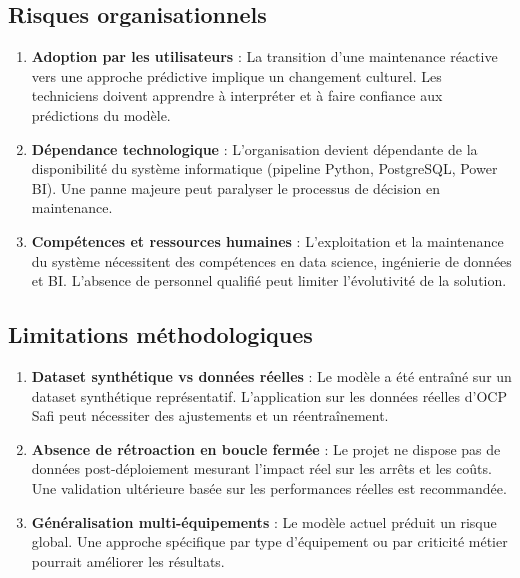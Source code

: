\documentclass[a4paper,12pt,twoside]{report}
\begin{document}
\subsection{Risques organisationnels}

\begin{enumerate}
    \item \textbf{Adoption par les utilisateurs} : La transition d'une maintenance réactive vers une approche prédictive implique un changement culturel. Les techniciens doivent apprendre à interpréter et à faire confiance aux prédictions du modèle.
    
    \item \textbf{Dépendance technologique} : L'organisation devient dépendante de la disponibilité du système informatique (pipeline Python, PostgreSQL, Power BI). Une panne majeure peut paralyser le processus de décision en maintenance.
    
    \item \textbf{Compétences et ressources humaines} : L'exploitation et la maintenance du système nécessitent des compétences en data science, ingénierie de données et BI. L'absence de personnel qualifié peut limiter l'évolutivité de la solution.
\end{enumerate}

\subsection{Limitations méthodologiques}

\begin{enumerate}
    \item \textbf{Dataset synthétique vs données réelles} : Le modèle a été entraîné sur un dataset synthétique représentatif. L'application sur les données réelles d'OCP Safi peut nécessiter des ajustements et un réentraînement.
    
    \item \textbf{Absence de rétroaction en boucle fermée} : Le projet ne dispose pas de données post-déploiement mesurant l'impact réel sur les arrêts et les coûts. Une validation ultérieure basée sur les performances réelles est recommandée.
    
    \item \textbf{Généralisation multi-équipements} : Le modèle actuel préduit un risque global. Une approche spécifique par type d'équipement ou par criticité métier pourrait améliorer les résultats.
\end{enumerate}
\end{document}
